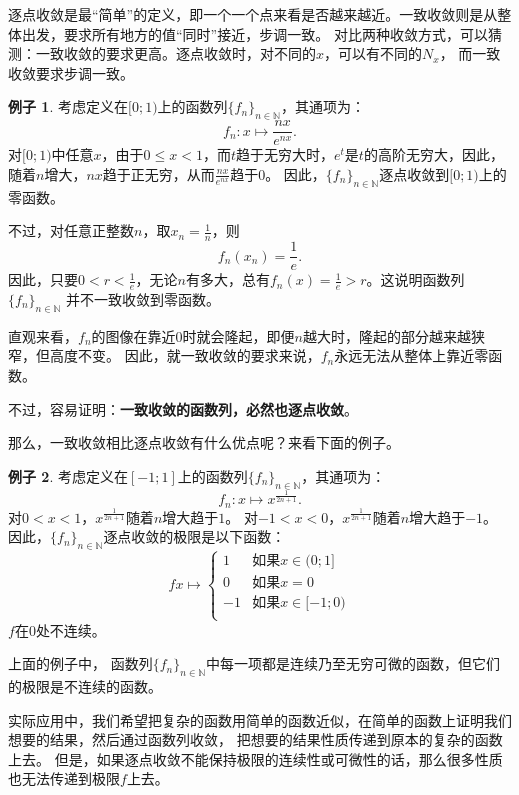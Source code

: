 \documentclass[12pt,UTF8]{ctexbook}
\theoremstyle{definition}
\newtheorem{ex}{例子}[section]
\theoremstyle{plain}
\begin{document}
逐点收敛是最“简单”的定义，即一个一个点来看是否越来越近。一致收敛则是从整体出发，要求所有地方的值“同时”接近，步调一致。
对比两种收敛方式，可以猜测：一致收敛的要求更高。逐点收敛时，对不同的$x$，可以有不同的$N_x$，
而一致收敛要求步调一致。

\begin{ex}
    考虑定义在$[0;1)$上的函数列$\{f_n\}_{n\in\mathbb{N}}$，其通项为：
    $$ f_n: x \mapsto \frac{nx}{e^{nx}}. $$
    对$[0;1)$中任意$x$，由于$0\leqslant x<1$，而$t$趋于无穷大时，$e^t$是$t$的高阶无穷大，因此，随着$n$增大，$nx$趋于正无穷，从而$\frac{nx}{e^{nx}}$趋于$0$。
    因此，$\{f_n\}_{n\in\mathbb{N}}$逐点收敛到$[0;1)$上的零函数。

    不过，对任意正整数$n$，取$x_n = \frac{1}{n}$，则
    $$f_n(x_n) = \frac{1}{e}.$$
    因此，只要$0<r <\frac{1}{e}$，无论$n$有多大，总有$f_n(x) = \frac{1}{e} > r$。这说明函数列$\{f_n\}_{n\in\mathbb{N}}$
    并不一致收敛到零函数。
    
    直观来看，$f_n$的图像在靠近$0$时就会隆起，即便$n$越大时，隆起的部分越来越狭窄，但高度不变。
    因此，就一致收敛的要求来说，$f_n$永远无法从整体上靠近零函数。

\end{ex}

不过，容易证明：\textbf{一致收敛的函数列，必然也逐点收敛}。

那么，一致收敛相比逐点收敛有什么优点呢？来看下面的例子。

\begin{ex}
    考虑定义在$[-1;1]$上的函数列$\{f_n\}_{n\in\mathbb{N}}$，其通项为：
    $$ f_n: x \mapsto x^{\frac{1}{2n+1}}. $$
    对$0<x<1$，$x^{\frac{1}{2n+1}}$随着$n$增大趋于$1$。
    对$-1<x<0$，$x^{\frac{1}{2n+1}}$随着$n$增大趋于$-1$。
    因此，$\{f_n\}_{n\in\mathbb{N}}$逐点收敛的极限是以下函数：
    $$
    f x\mapsto \left\{
        \begin{array}{ll}
            1 & \mbox{如果} x \in (0; 1] \\
            0 & \mbox{如果} x = 0 \\
            -1 & \mbox{如果} x \in [-1; 0) \\
        \end{array}
    \right.
    $$
    $f$在$0$处不连续。
\end{ex}
上面的例子中，
函数列$\{f_n\}_{n\in\mathbb{N}}$中每一项都是连续乃至无穷可微的函数，但它们的极限是不连续的函数。

实际应用中，我们希望把复杂的函数用简单的函数近似，在简单的函数上证明我们想要的结果，然后通过函数列收敛，
把想要的结果性质传递到原本的复杂的函数上去。
但是，如果逐点收敛不能保持极限的连续性或可微性的话，那么很多性质也无法传递到极限$f$上去。
\end{document}
